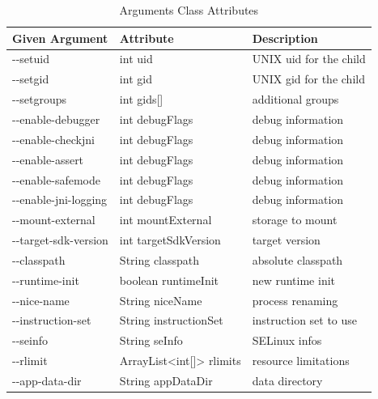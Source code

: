 \begin{table}[htb]
  \caption[Arguments Class Attributes]{Arguments Class Attributes}
  \label{tab:argument_class_attributes}
  \centering
  \begin{tabular}{l l l}
    \toprule
     Given Argument & Attribute & Description \\
     \midrule
     -{}-setuid & int uid & UNIX uid for the child \\
     -{}-setgid & int gid & UNIX gid for the child \\
     -{}-setgroups & int gids[] & additional groups \\
     -{}-enable-debugger & int debugFlags & debug information \\
     -{}-enable-checkjni & int debugFlags & debug information \\
     -{}-enable-assert & int debugFlags & debug information \\
     -{}-enable-safemode & int debugFlags & debug information \\
     -{}-enable-jni-logging & int debugFlags & debug information \\
     -{}-mount-external & int mountExternal & storage to mount \\
     -{}-target-sdk-version & int targetSdkVersion & target version \\
     -{}-classpath & String classpath & absolute classpath \\
     -{}-runtime-init & boolean runtimeInit & new runtime init \\
     -{}-nice-name & String niceName & process renaming \\
     -{}-instruction-set & String instructionSet & instruction set to use \\
     -{}-seinfo & String seInfo & SELinux infos  \\
     -{}-rlimit & ArrayList<int[]> rlimits & resource limitations \\
     -{}-app-data-dir & String appDataDir & data directory \\
      \bottomrule
  \end{tabular}
\end{table}


